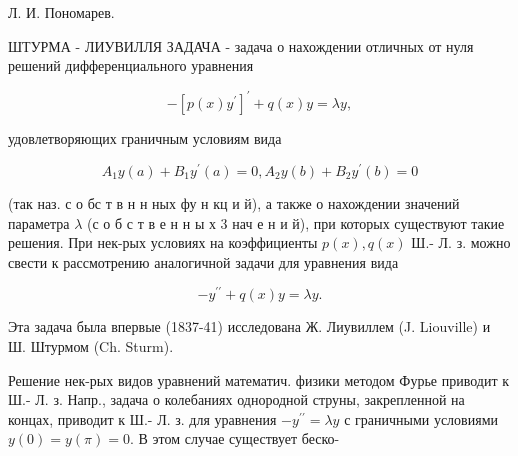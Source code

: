\documentclass[10pt]{article}
\begin{document}
Л. И. Пономарев.



ШТУРМА - ЛИУВИЛЛЯ ЗАДАЧА - задача о нахождении отличных от нуля решений дифференциального уравнения



\[

-\left[p(x) y^{\prime}\right]^{\prime}+q(x) y=\lambda y,

\]



удовлетворяющих граничным условиям вида



\[

A_{1} y(a)+B_{1} y^{\prime}(a)=0, A_{2} y(b)+B_{2} y^{\prime}(b)=0

\]



(так наз. с о бс т в н н ных фу н кц и й), а также о нахождении значений параметра $\lambda$ (с о б с т в е н н ы х 3 нач е н и й), при которых существуют такие решения. При нек-рых условиях на коэффициенты $p(x), q(x)$ Ш.- Л. з. можно свести к рассмотрению аналогичной задачи для уравнения вида



\[

-y^{\prime \prime}+q(x) y=\lambda y .

\]



Эта задача была впервые (1837-41) исследована Ж. Лиувиллем (J. Liouville) и Ш. Штурмом (Ch. Sturm).



Решение нек-рых видов уравнений математич. физики методом Фурье приводит к Ш.- Л. з. Напр., задача о колебаниях однородной струны, закрепленной на концах, приводит к Ш.- Л. з. для уравнения $-y^{\prime \prime}=\lambda y$ с граничными условиями $y(0)=y(\pi)=0$. В этом случае существует беско-
\end{document}
